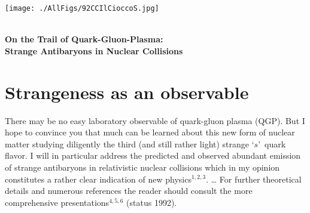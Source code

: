 \begin{mdframed}[linecolor=gray,roundcorner=12pt,backgroundcolor=Dandelion!15,linewidth=1pt,leftmargin=0cm,rightmargin=0cm,topline=true,bottomline=true,skipabove=12pt]\relax%
%
\centerline{\texttt{[image: ./AllFigs/92CCIlCioccoS.jpg]}}
{}\\[0.4cm]
%
%
{\Large \bf On the Trail of Quark-Gluon-Plasma:\\
Strange Antibaryons in Nuclear Collisions}
%
\section*{Strangeness as an observable}\label{Trail1992}
There may be no easy laboratory observable of quark-gluon plasma (QGP).
But I hope to convince you that much can be learned about this new form
of nuclear matter studying diligently the third (and still rather light)
strange \lq $s$\rq\ quark flavor. I will in particular address the predicted and observed abundant emission of strange antibaryons in relativistic nuclear collisions which in my opinion constitutes a rather clear indication of new physics$^{1,2,3}$. \ldots
For further theoretical details and numerous references the reader should consult the more comprehensive presentations$^{4,5,6}$ (status 1992).
 

\end{mdframed}
